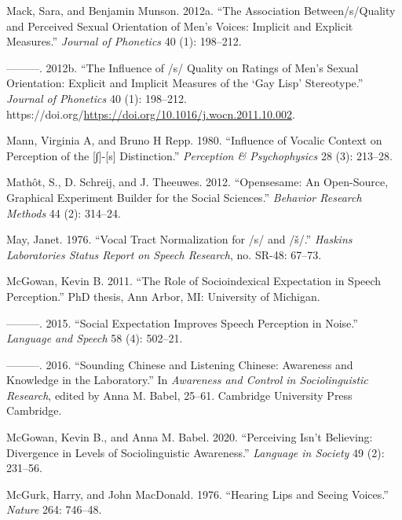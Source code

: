 \documentclass[
  letterpaper,
  DIV=11,
  numbers=noendperiod]{scrartcl}
\newlength{\cslhangindent}
\newenvironment{CSLReferences}[2] %
 {\begin{list}{}{%
  \setlength{\itemindent}{0pt}
  \setlength{\leftmargin}{0pt}
  \setlength{\parsep}{0pt}
  \ifodd #1
   \setlength{\leftmargin}{\cslhangindent}
   \setlength{\itemindent}{-1\cslhangindent}
  \fi
  \setlength{\itemsep}{#2\baselineskip}}}
 {\end{list}}
\begin{document}
\begin{CSLReferences}{1}{0}
Mack, Sara, and Benjamin Munson. 2012a. {``The Association
Between/s/Quality and Perceived Sexual Orientation of Men's Voices:
Implicit and Explicit Measures.''} \emph{Journal of Phonetics} 40 (1):
198--212.

---------. 2012b. {``The Influence of /s/ Quality on Ratings of Men's
Sexual Orientation: Explicit and Implicit Measures of the {`Gay Lisp'}
Stereotype.''} \emph{Journal of Phonetics} 40 (1): 198--212.
https://doi.org/\url{https://doi.org/10.1016/j.wocn.2011.10.002}.

Mann, Virginia A, and Bruno H Repp. 1980. {``Influence of Vocalic
Context on Perception of the {[}∫{]}-{[}s{]} Distinction.''}
\emph{Perception \& Psychophysics} 28 (3): 213--28.

Mathôt, S., D. Schreij, and J. Theeuwes. 2012. {``Opensesame: An
Open-Source, Graphical Experiment Builder for the Social Sciences.''}
\emph{Behavior Research Methods} 44 (2): 314--24.

May, Janet. 1976. {``Vocal Tract Normalization for /s/ and /š/.''}
\emph{Haskins Laboratories Status Report on Speech Research}, no. SR-48:
67--73.

McGowan, Kevin B. 2011. {``The Role of Socioindexical Expectation in
Speech Perception.''} PhD thesis, Ann Arbor, MI: University of Michigan.

---------. 2015. {``Social Expectation Improves Speech Perception in
Noise.''} \emph{Language and Speech} 58 (4): 502--21.

---------. 2016. {``Sounding Chinese and Listening Chinese: Awareness
and Knowledge in the Laboratory.''} In \emph{Awareness and Control in
Sociolinguistic Research}, edited by Anna M. Babel, 25--61. Cambridge
University Press Cambridge.

McGowan, Kevin B., and Anna M. Babel. 2020. {``Perceiving Isn't
Believing: Divergence in Levels of Sociolinguistic Awareness.''}
\emph{Language in Society} 49 (2): 231--56.

McGurk, Harry, and John MacDonald. 1976. {``Hearing Lips and Seeing
Voices.''} \emph{Nature} 264: 746--48.


\end{CSLReferences}
\end{document}
